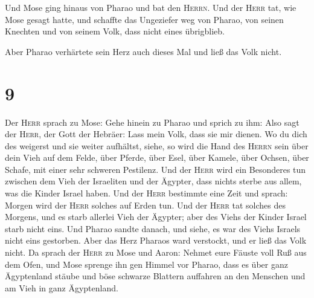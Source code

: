  Und Mose ging hinaus von Pharao und bat den
\textsc{Herrn}.  Und der \textsc{Herr} tat, wie Mose
gesagt hatte, und schaffte das Ungeziefer weg von Pharao, von seinen
Knechten und von seinem Volk, dass nicht eines übrigblieb.

 Aber Pharao verhärtete sein Herz auch dieses Mal und
ließ das Volk nicht.

\hypertarget{section-8}{%
\section{9}\label{section-8}}

 Der \textsc{Herr} sprach zu Mose: Gehe hinein zu Pharao
und sprich zu ihm: Also sagt der \textsc{Herr}, der Gott der Hebräer:
Lass mein Volk, dass sie mir dienen.  Wo du dich des
weigerst und sie weiter aufhältst,  siehe, so wird die
Hand des \textsc{Herrn} sein über dein Vieh auf dem Felde, über Pferde,
über Esel, über Kamele, über Ochsen, über Schafe, mit einer sehr
schweren Pestilenz.  Und der \textsc{Herr} wird ein
Besonderes tun zwischen dem Vieh der Israeliten und der Ägypter, dass
nichts sterbe aus allem, was die Kinder Israel haben.  Und
der \textsc{Herr} bestimmte eine Zeit und sprach: Morgen wird der
\textsc{Herr} solches auf Erden tun.  Und der
\textsc{Herr} tat solches des Morgens, und es starb allerlei Vieh der
Ägypter; aber des Viehs der Kinder Israel starb nicht eins.
 Und Pharao sandte danach, und siehe, es war des Viehs
Israels nicht eins gestorben. Aber das Herz Pharaos ward verstockt, und
er ließ das Volk nicht.  Da sprach der \textsc{Herr} zu
Mose und Aaron: Nehmet eure Fäuste voll Ruß aus dem Ofen, und Mose
sprenge ihn gen Himmel vor Pharao,  dass es über ganz
Ägyptenland stäube und böse schwarze Blattern auffahren an den Menschen
und am Vieh in ganz Ägyptenland.

